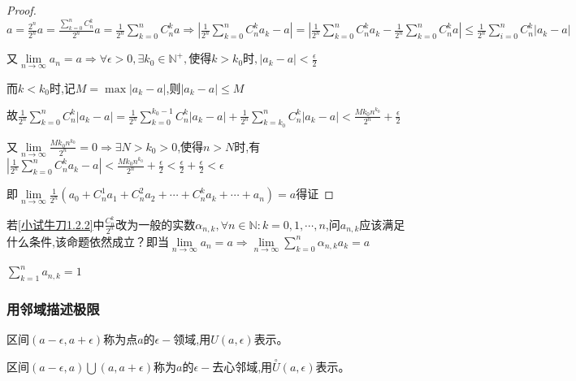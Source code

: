\begin{proof}
    $a = \frac{2^n}{2^n} a
        =\frac{\sum\limits_{k=0}^{n} C_n^k}{2^n} a
        =\frac{1}{2^n} \sum\limits_{k=0}^{n} C_n^k a \Longrightarrow |\frac{1}{2^n} \sum\limits_{k=0}^{n} C_n^k a_k - a|
        =|\frac{1}{2^n} \sum\limits_{k=0}^{n} C_n^k a_k - \frac{1}{2^n} \sum\limits_{k=0}^{n} C_n^k a|
        \le \frac{1}{2^n} \sum\limits_{i=0}^{n} C_n^k |a_k-a|$

    又$\lim \limits_{n \to \infty} a_n = a
        \Longrightarrow \forall \epsilon>0,\exists k_0 \in \mathbb{N}^+,\mbox{使得}k>k_0时,|a_k-a|<\frac{\epsilon}{2}$

    而$k<k_0$时,记$M=\max |a_k-a|$,则$|a_k-a|\le M$

    故$\frac{1}{2^n} \sum\limits_{k=0}^{n} C_n^k |a_k-a|=\frac{1}{2^n} \sum\limits_{k=0}^{k_0-1} C_n^k |a_k-a| + \frac{1}{2^n} \sum\limits_{k=k_0}^{n} C_n^k |a_k-a|< \frac{Mk_0n^{k_0}}{2^n} + \frac{\epsilon}{2}$

    又$\lim \limits_{n \to \infty} \frac{Mk_0n^{k_0}}{2^n}=0 \Longrightarrow \exists N>k_0>0$,使得$n>N$时,有$|\frac{1}{2^n} \sum\limits_{k=0}^{n} C_n^k a_k - a| < \frac{Mk_0n^{k_0}}{2^n} + \frac{\epsilon}{2}<\frac{\epsilon}{2} + \frac{\epsilon}{2}<\epsilon$

    即$\lim \limits_{n \to \infty} \frac{1}{2^n} (a_0+C_n^1 a_1 + C_n^2 a_2 + \cdots + C_n^k a_k + \cdots + a_n)=a$得证
\end{proof}

\begin{practice}
    若\cref{小试牛刀1.2.2}中$\frac{C_n^k}{2^n}$改为一般的实数$\alpha_{n,k},\forall n\in \mathbb{N}:k=0,1,\cdots,n$,问$a_{n,k}$应该满足什么条件,该命题依然成立？即当$\lim \limits_{n \to \infty}a_n=a\Longrightarrow \lim \limits_{n \to \infty} \sum\limits_{k=0}^{n} \alpha_{n,k}a_k=a$
\end{practice}

\begin{solution}
    $\sum\limits_{k=1}^{n} a_{n,k}=1$
\end{solution}

\subsubsection{用邻域描述极限}
\begin{definition}[邻域]
    区间$(a-\epsilon,a+\epsilon)$称为点$a$的$\epsilon-$领域,用$U(a,\epsilon)$表示。

    区间$(a-\epsilon,a)\bigcup (a,a+\epsilon)$称为$a$的$\epsilon-$去心邻域,用$\overset{\circ}{U}(a,\epsilon)$表示。
\end{definition}

